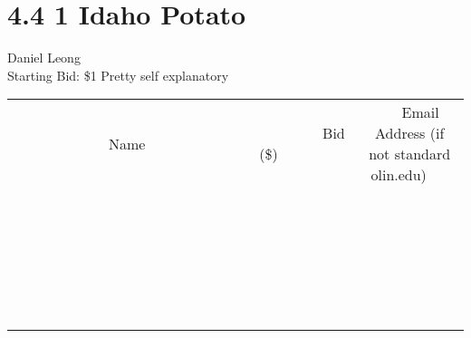 \documentclass[11pt]{article}
\begin{document}
\section*{4.4 1 Idaho Potato}
Daniel Leong
\\
Starting Bid: \$1
\newline
Pretty self explanatory
\\[6ex]
\begin{tabular}{c c c}
~~~~~~~~~~~~~Name~~~~~~~~~~~~~ & ~~~~~~~~~Bid (\$)~~~~~~~~~  & ~~~Email Address (if not standard olin.edu)~~~\\
 & & \\
\hline
 & & \\
\hline
 & & \\
\hline
 & & \\
\hline
 & & \\
\hline
 & & \\
\hline
 & & \\
\hline
 & & \\
\hline
 & & \\
\hline
 & & \\
\hline
 & & \\
\hline
 & & \\
\hline
 & & \\
\hline
 & & \\
\hline
 & & \\
\hline
 & & \\
\hline
 & & \\
\hline
 & & \\
\hline
 & & \\
\hline
 & & \\
\hline
 & & \\
\hline
 & & \\
\hline
 & & \\
\hline
 & & \\
\hline
 & & \\
\hline
 & & \\
\hline
\end{tabular}
\newpage
\end{document}
